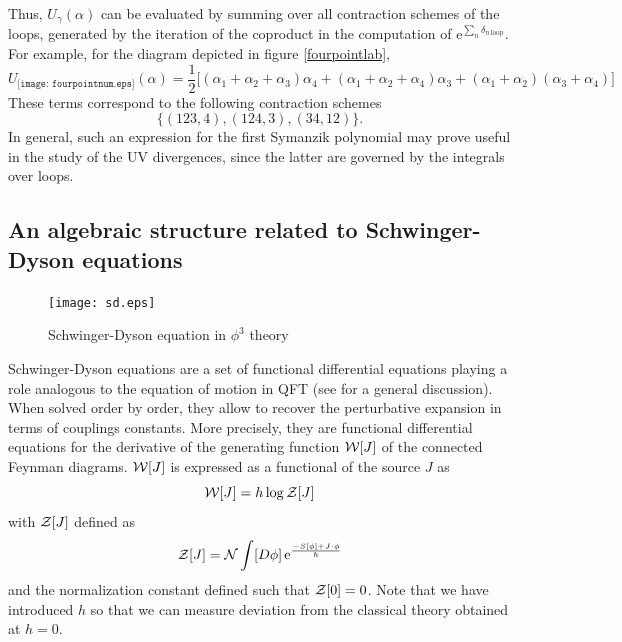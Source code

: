 \documentclass[10pt,here,feynmf]{article}
\begin{document}
Thus, $U_{\gamma}(\alpha)$ can be evaluated by summing over all contraction schemes of the loops, generated by the iteration of the coproduct in the computation of  $\mathrm{e}^{\sum_{n}\delta_{n\,\mathrm{loop}}}$. For example, for the diagram depicted in figure \ref{fourpointlab},
\begin{equation}
U_{\texttt{[image: fourpointnum.eps]}}(\alpha)=
\frac{1}{2}\big[
(\alpha_{1}+\alpha_{2}+\alpha_{3})\alpha_{4}+
(\alpha_{1}+\alpha_{2}+\alpha_{4})\alpha_{3}+
(\alpha_{1}+\alpha_{2})(\alpha_{3}+\alpha_{4})
\big]
\end{equation}
These terms correspond to the following contraction schemes
\begin{equation}
\big\{(123,4),(124,3),(34,12)\big\}.
\end{equation}
In general, such an expression for the first Symanzik polynomial may prove useful in the study of the UV divergences, since the latter are governed by the integrals over loops. 



\subsection{An algebraic structure related to Schwinger-Dyson equations}


\begin{figure}
\centerline{\texttt{[image: sd.eps]}}
\caption{Schwinger-Dyson equation in $\phi^{3}$ theory}
\label{SDfig}
\end{figure}


Schwinger-Dyson equations are a set of functional differential equations playing a role analogous to the equation of motion in QFT (see \cite{cvitanovic} for a general discussion). When solved order by order, they allow to recover the perturbative expansion in terms of couplings constants. More precisely, they are functional differential equations for the derivative of the generating function ${\cal W}[J]$ of the connected Feynman diagrams.  ${\cal W}[J]$ is expressed as a functional of the source $J$ as
\begin{equation}
{\cal W}[J]=h\log{\cal Z}[J]
\end{equation}
with ${\cal Z}[J]$ defined as
\begin{equation}
{\cal Z}[J]={\cal N}\int[D\phi]\,\mathrm{e}^{\frac{-S[\phi]+J\cdot\phi}{h}}
\end{equation}
and the normalization constant defined such that ${\cal Z}[0]=0$. Note that we have introduced $h$ so that we can measure deviation from the classical theory obtained at $h=0$.
\end{document}
